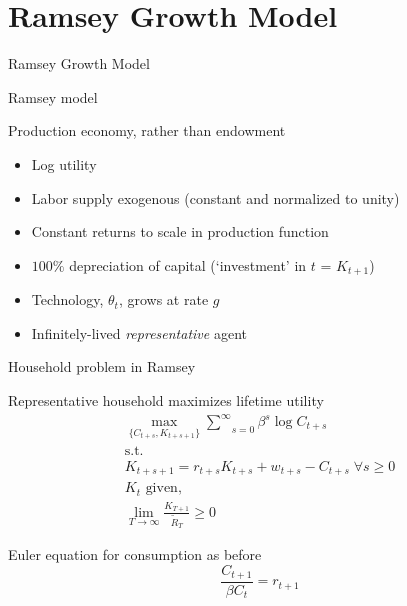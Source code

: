 \section{Ramsey Growth Model}

\begin{frame}

\begin{center}
{\LARGE Ramsey Growth Model}
\end{center}

\end{frame}


\begin{frame}{Ramsey model}

Production economy, rather than endowment
\begin{itemize}
\item Log utility
\item Labor supply exogenous (constant and normalized to unity)
\item Constant returns to scale in production function
\item $100\%$ depreciation of capital (`investment' in $t$ = $K_{t+1}$)
\item Technology, $\theta_{t}$, grows at rate $g$
\item Infinitely-lived \textit{representative} agent
\end{itemize}

\end{frame}


\begin{frame}{Household problem in Ramsey}

Representative household maximizes lifetime utility
\begin{gather*}
\underset{\{C_{t+s},K_{t+s+1}\}}{\max }\underset{s=0}{\overset{\infty }{\sum}}\beta ^{s}\log C_{t+s} \\
\text{s.t.} \\
K_{t+s+1}=r_{t+s}K_{t+s}+w_{t+s}- C_{t+s} \; \forall s\geq 0 \\
K_{t}\text{ given,} \\
\underset{T\rightarrow \infty }{\lim }\frac{K_{T+1}}{\tilde{R}_{T}}\geq 0
\end{gather*}

Euler equation for consumption as before
\begin{equation*}
\frac{C_{t+1}}{\beta C_{t}}=r_{t+1}
\end{equation*}

\end{frame}

